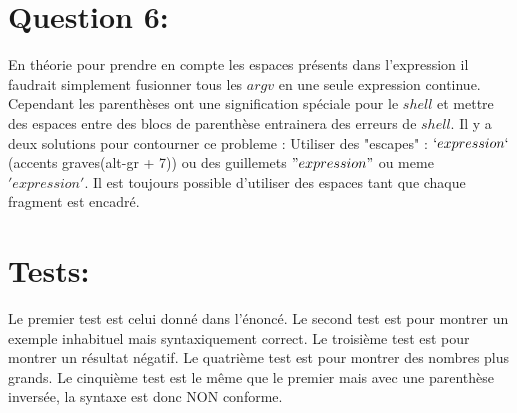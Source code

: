 \documentclass[a4paper]{article}
\begin{document}
\section*{Question 6:}
En théorie pour prendre en compte les espaces présents dans l'expression il faudrait simplement fusionner tous les $argv$ en une seule expression continue. Cependant les parenthèses ont une signification spéciale pour le $shell$ et mettre des espaces entre des blocs de parenthèse entrainera des erreurs de $shell$.
Il y a deux solutions pour contourner ce probleme :\newline
Utiliser des "escapes" : $`expression`$ (accents graves(alt-gr + 7)) ou des guillemets $"expression"$ ou meme $'expression'$.
Il est toujours possible d'utiliser des espaces tant que chaque fragment est encadré.

\section*{Tests:}
Le premier test est celui donné dans l'énoncé.\newline
Le second test est pour montrer un exemple inhabituel mais syntaxiquement correct.\newline
Le troisième test est pour montrer un résultat négatif.\newline
Le quatrième test est pour montrer des nombres plus grands.\newline
Le cinquième test est le même que le premier mais avec une parenthèse inversée, la syntaxe est donc NON conforme.
\end{document}
